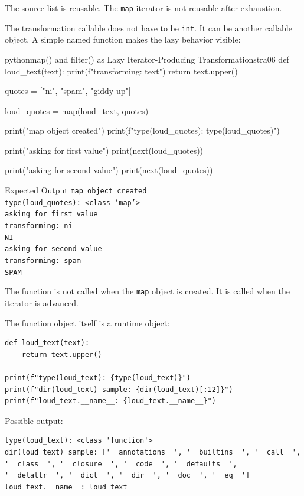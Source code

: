 \documentclass[a4paper,twoside]{report}
\begin{document}
The source list is reusable. The \texttt{map} iterator is not reusable after exhaustion.

The transformation callable does not have to be \texttt{int}. It can be another callable object. A simple named function makes the lazy behavior visible:

\begin{codebox}[]{python}{map() and filter() as Lazy Iterator-Producing Transformations}{tra06}
def loud_text(text):
    print(f"transforming: {text}")
    return text.upper()

quotes = ["ni", "spam", "giddy up"]

loud_quotes = map(loud_text, quotes)

print("map object created")
print(f"type(loud_quotes): {type(loud_quotes)}")

print("asking for first value")
print(next(loud_quotes))

print("asking for second value")
print(next(loud_quotes))
\end{codebox}


\begin{iobox}{Expected Output}
\texttt{map object created} \\
\texttt{type(loud\_quotes): <class 'map'>} \\
\texttt{asking for first value} \\
\texttt{transforming: ni} \\
\texttt{NI} \\
\texttt{asking for second value} \\
\texttt{transforming: spam} \\
\texttt{SPAM} \\
\end{iobox}




The function is not called when the \texttt{map} object is created. It is called when the iterator is advanced.

The function object itself is a runtime object:

\begin{verbatim}
def loud_text(text):
    return text.upper()

print(f"type(loud_text): {type(loud_text)}")
print(f"dir(loud_text) sample: {dir(loud_text)[:12]}")
print(f"loud_text.__name__: {loud_text.__name__}")
\end{verbatim}

Possible output:

\begin{verbatim}
type(loud_text): <class 'function'>
dir(loud_text) sample: ['__annotations__', '__builtins__', '__call__',
'__class__', '__closure__', '__code__', '__defaults__',
'__delattr__', '__dict__', '__dir__', '__doc__', '__eq__']
loud_text.__name__: loud_text
\end{verbatim}
\end{document}
